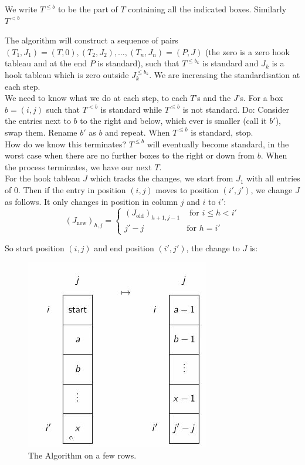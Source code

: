 \documentclass{article}
\begin{document}
\begin{notation}
  We write $T^{\le b}$ to be the part of $T$ containing all the indicated boxes. Similarly $T^{< b}$
\end{notation}

The algorithm will construct a sequence of pairs $(T_1, J_1) = (T, 0),(T_2, J_2),\dots, (T_n, J_n) = (P,J)$ (the zero is a zero hook tableau and at the end $P$ is standard), such that $T^{\le b_k}$ is standard and $J_k$ is a hook tableau which is zero outside $J^{\le b_k}_k$. We are increasing the standardisation at each step. \\

\noindent
We need to know what we do at each step, to each $T$'s and the $J$'s. For a box $b = (i, j)$ such that $T^{< b}$ is standard while $T^{\le b}$ is not standard. Do: Consider the entries next to $b$ to the right and below, which ever is smaller (call it $b'$), swap them. Rename $b'$ as $b$ and repeat. When $T^{\le b}$ is standard, stop.\\

\noindent
How do we know this terminates? $T^{\le b}$ will eventually become standard, in the worst case when there are no further boxes to the right or down from $b$. When the process terminates, we have our next $T$.\\

\newpage
For the hook tableau $J$ which tracks the changes, we start from $J_1$ with all entries of $0$. Then if the entry in position $(i, j)$ moves to position  $(i', j')$, we change $J$ as follows. It only changes in position in column $j$ and $i$ to $i'$:
$$ (J_{\text{new}})_{h,j} = \begin{cases}
  (J_{\text{old}})_{h+1,j-1} & \text{ for $i \le h < i'$}\\
  j'-j & \text{for $h = i'$}
\end{cases} $$

So start position $(i, j)$ and end position $(i', j')$, the change to $J$ is:
\begin{figure}[!ht]
  \centering
  \includegraphics{./figures/L3.4}
  \caption{The Algorithm on a few rows.}
\end{figure}
\end{document}
